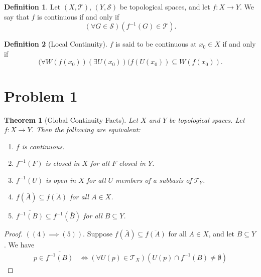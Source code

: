 \documentclass[10pt,a4paper]{article}
\author{Jeremiah Givens}
\theoremstyle{theorem}
\newtheorem{theorem}{Theorem}
\theoremstyle{definition}
\newtheorem{definition}{Definition}
\newcommand{\Tau}{\mathcal{T}}
\begin{document}
\begin{definition}
Let $(X, \Tau)$, $(Y, \mathcal{S})$ be topological spaces, and let $f : X \to Y$. We say that $f$ is continuous if and only if 
\begin{equation*}
(\forall G \in \mathcal{S})(f^{-1}(G) \in \Tau).
\end{equation*}
\end{definition}

\begin{definition}[Local Continuity] $f$ is said to be continuous at $x_0 \in X$ if and only if 
\begin{equation*}
(\forall W(f(x_0))(\exists U(x_0))(f(U(x_0)) \subseteq W(f(x_0)).
\end{equation*}
\end{definition}

\section*{Problem 1}
\begin{theorem}[Global Continuity Facts]
Let $X$ and $Y$ be topological spaces. Let $f:X \to Y$. Then the following are equivalent:
\begin{enumerate}
\item $f$ is continuous.
\item $f^{-1}(F)$ is closed in $X$ for all $F$ closed in $Y$.
\item $f^{-1}(U)$ is open in $X$ for all $U$ members of a subbasis of $\Tau_Y$.
\item $f(\bar{A}) \subseteq \overline{f(A)}$ for all $A \in X$.
\item $\overline{f^{-1}(B)} \subseteq f^{-1}(\bar{B})$ for all $B \subseteq Y$.
\end{enumerate}
\end{theorem}

\begin{proof}$((4) \implies (5))$.  Suppose $f(\bar{A}) \subseteq \overline{f(A)}$ for all $A \in X$, and let $B \subseteq Y$. We have
\begin{align*}
p \in \overline{f^{-1}(B)} &\iff (\forall U(p) \in \Tau_X)(U(p) \cap f^{-1}(B) \not = \emptyset)
\end{align*}
\end{proof}
\end{document}
